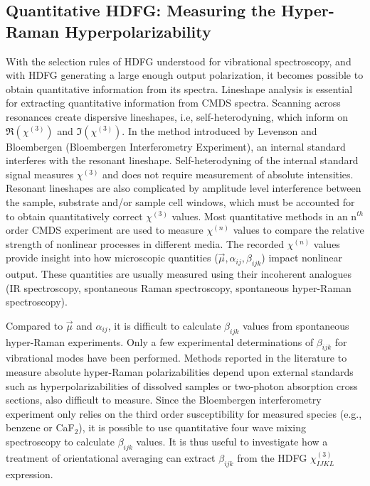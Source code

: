 \documentclass[aip, jcp, reprint, onecolumn]{revtex4-2}
\begin{document}
\subsection{Quantitative HDFG: Measuring the Hyper-Raman Hyperpolarizability}
With the selection rules of HDFG understood for vibrational spectroscopy, and with HDFG generating a large enough output polarization, it becomes possible to obtain quantitative information from its spectra.
Lineshape analysis is essential for extracting quantitative information from CMDS spectra.
Scanning across resonances create dispersive lineshapes, i.e, self-heterodyning, which inform on $\Re(\chi^{(3)})$ and $\Im(\chi^{(3)})$.\cite{Levenson1974_1, Levenson1974_2}
In the method introduced by Levenson and Bloembergen (Bloembergen Interferometry Experiment), an internal standard interferes with the resonant lineshape.
Self-heterodyning of the internal standard signal measures $\chi^{(3)}$ and does not require measurement of absolute intensities. 
Resonant lineshapes are also complicated by amplitude level interference between the sample,  substrate and/or sample cell windows, which must be accounted for to obtain quantitatively correct $\chi^{(3)}$ values. \cite{RN362, RN418}
Most quantitative methods in an n$^{th}$ order CMDS experiment are used to measure $\chi^{(n)}$ values to compare the relative strength of nonlinear processes in different media. \cite{Zhu87, RN351, RN345}
The recorded $\chi^{(n)}$ values provide insight into how microscopic quantities ($\vec{\mu}, \alpha_{ij}, \beta_{ijk}$) impact nonlinear output.
These quantities are usually measured using their incoherent analogues (IR spectroscopy, spontaneous Raman spectroscopy, spontaneous hyper-Raman spectroscopy). \cite{Levenson1974_2, RN412, Shoute2005}

Compared to $\vec{\mu}$ and $\alpha_{ij}$, it is difficult to calculate $\beta_{ijk}$ values from spontaneous hyper-Raman experiments. \cite{Kelley2010}
Only a few experimental determinations of $\beta_{ijk}$ for vibrational modes have been performed. \cite{Xu1997, Shoute2005, Kelley2010}
Methods reported in the literature to measure absolute hyper-Raman polarizabilities depend upon external standards such as hyperpolarizabilities of dissolved samples or two-photon absorption cross sections, also difficult to measure.
Since the Bloembergen interferometry experiment only relies on the third order susceptibility for measured species (e.g., benzene or CaF$_2$),\cite{Levenson1974_2} it is possible to use quantitative four wave mixing spectroscopy to calculate $\beta_{ijk}$ values.
It is thus useful to investigate how a treatment of orientational averaging can extract $\beta_{ijk}$ from the HDFG $\chi^{(3)}_{IJKL}$ expression.
\end{document}
